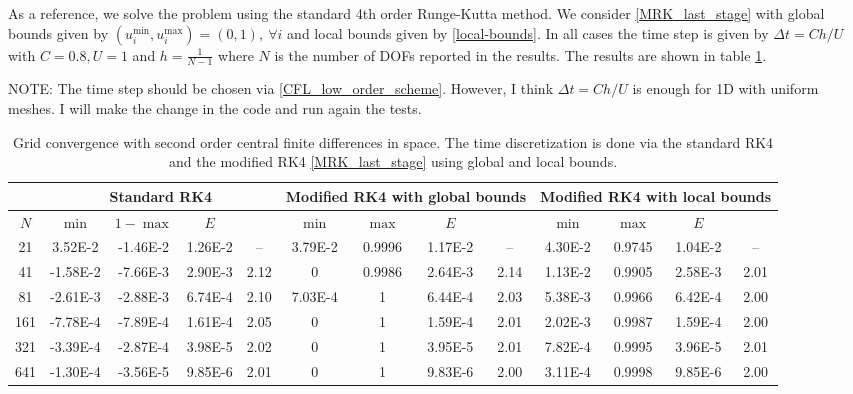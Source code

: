 \documentclass{article}
\numberwithin{remark}{subsection}
\begin{document}
%
As a reference, we solve the problem using the standard 4th order Runge-Kutta method.
We consider \eqref{MRK_last_stage} with global bounds given by $(u_i^{\min}, u_i^{\max})=(0,1), ~\forall i$
and local bounds given by \eqref{local-bounds}.
In all cases the time step is given by $\Delta t=C h/U$ with $C=0.8, U=1$ and $h=\frac{1}{N-1}$ where $N$ is the number of DOFs
reported in the results. The results are shown in table \ref{table:MRK4_limiting_last_stage}.

{\color{red} NOTE: The time step should be chosen via \eqref{CFL_low_order_scheme}.
  However, I think $\Delta t=C h/U$ is enough for 1D with uniform meshes. I will make the change in the code and run again the tests.}

\begin{table}[h]\scriptsize
\begin{center}
\begin{tabular}{|c||c|c|c|c||c|c|c|c||c|c|c|c||} \cline{1-13}
\multicolumn{1}{|c||}{} &
\multicolumn{4}{|c||}{Standard RK4} &
\multicolumn{4}{|c||}{Modified RK4 with global bounds} &
\multicolumn{4}{|c||}{Modified RK4 with local bounds} \\ \hline
$N$ & $ \min$ &  $1-\max$ & $ E $ &  & $\min$ &  $\max$ & $E$ &   & $\min$ & $\max$ & $E$ &  \\ \hline
21  & 3.52E-2 & -1.46E-2 & 1.26E-2 & --   & 3.79E-2 & 0.9996 & 1.17E-2 & --   & 4.30E-2 & 0.9745 & 1.04E-2 & --    \\ \hline
41  & -1.58E-2 & -7.66E-3 & 2.90E-3 & 2.12 & 0       & 0.9986 & 2.64E-3 & 2.14 & 1.13E-2 & 0.9905 & 2.58E-3 & 2.01 \\ \hline
81  & -2.61E-3 & -2.88E-3 & 6.74E-4 & 2.10 & 7.03E-4 & 1      & 6.44E-4 & 2.03 & 5.38E-3 & 0.9966 & 6.42E-4 & 2.00 \\ \hline
161 & -7.78E-4 & -7.89E-4 & 1.61E-4 & 2.05 & 0       & 1      & 1.59E-4 & 2.01 & 2.02E-3 & 0.9987 & 1.59E-4 & 2.00 \\ \hline
321 & -3.39E-4 & -2.87E-4 & 3.98E-5 & 2.02 & 0       & 1      & 3.95E-5 & 2.01 & 7.82E-4 & 0.9995 & 3.96E-5 & 2.01 \\ \hline
641 & -1.30E-4 & -3.56E-5 & 9.85E-6 & 2.01 & 0       & 1      & 9.83E-6 & 2.00 & 3.11E-4 & 0.9998 & 9.85E-6 & 2.00 \\ \hline
\end{tabular}
\caption{Grid convergence with second order central finite differences in space.
  The time discretization is done via the standard RK4
  and the modified RK4 \eqref{MRK_last_stage} using global and local bounds.}
\label{table:MRK4_limiting_last_stage}
\end{center}
\end{table}


%

\end{document}
